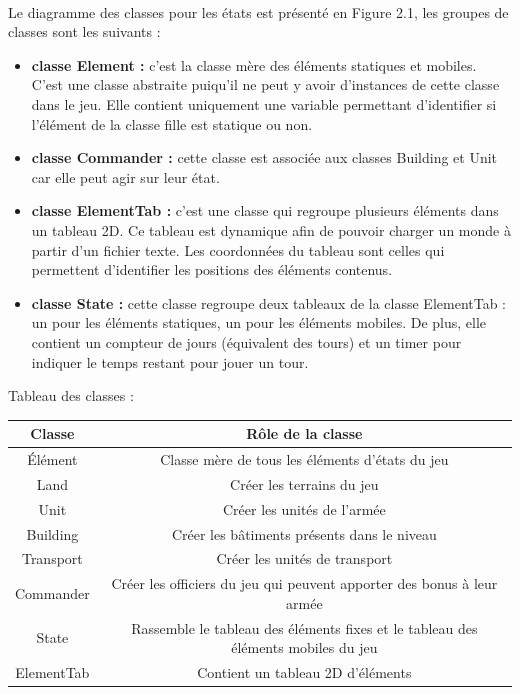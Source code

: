 \documentclass[12pt]{report}
\begin{document}
\paragraph{}Le diagramme des classes pour les états est présenté en Figure 2.1, les groupes de classes sont les suivants :
\begin{itemize}
    \item \textbf{classe Element :} c'est la classe mère des éléments statiques et mobiles. C'est une classe abstraite puiqu'il ne peut y avoir d'instances de cette classe dans le jeu. Elle contient uniquement une variable permettant d'identifier si l'élément de la classe fille est statique ou non.
    \item \textbf{classe Commander :} cette classe est associée aux classes Building et Unit car elle peut agir sur leur état.
    \item \textbf{classe ElementTab :} c'est une classe qui regroupe plusieurs éléments dans un tableau 2D. Ce tableau est dynamique afin de pouvoir charger un monde à partir d'un fichier texte. Les coordonnées du tableau sont celles qui permettent d'identifier les positions des éléments contenus.
    \item \textbf{classe State :} cette classe regroupe deux tableaux de la classe ElementTab : un pour les éléments statiques, un pour les éléments mobiles. De plus, elle contient un compteur de jours (équivalent des tours) et un timer pour indiquer le temps restant pour jouer un tour.
 \end{itemize} 
 \hfill

\paragraphe{}Tableau des classes :\newline

\begin{tabular}{|c|c|}
\hline
Classe & Rôle de la classe\\
\hline
Élément & Classe mère de tous les éléments d'états du jeu\\\hline
Land & Créer les terrains du jeu \\\hline
Unit & Créer les unités de l'armée \\\hline
Building & Créer les bâtiments présents dans le niveau \\\hline
Transport & Créer les unités de transport \\\hline
Commander & Créer les officiers du jeu qui peuvent apporter des bonus à leur armée \\\hline
State &  Rassemble le tableau des éléments fixes et le tableau des éléments mobiles du jeu\\\hline
ElementTab & Contient un tableau 2D d'éléments\\
\hline
\end{tabular}
\end{document}
